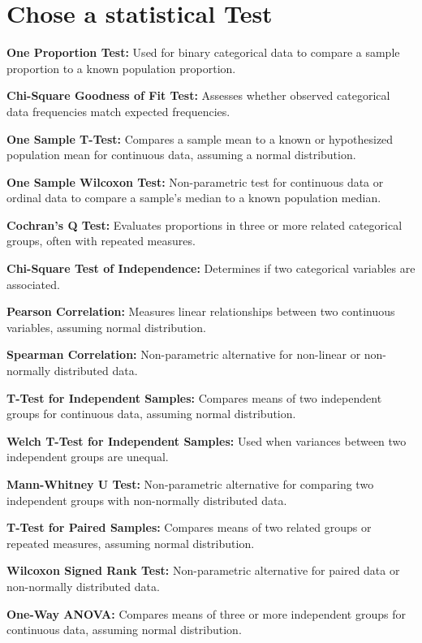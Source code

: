 \documentclass[
  a4paper,
]{scrbook}
\begin{document}

\chapter{Chose a statistical Test}\label{chose-a-statistical-test}

\textbf{One Proportion Test:} Used for binary categorical data to
compare a sample proportion to a known population proportion.

\textbf{Chi-Square Goodness of Fit Test:} Assesses whether observed
categorical data frequencies match expected frequencies.

\textbf{One Sample T-Test:} Compares a sample mean to a known or
hypothesized population mean for continuous data, assuming a normal
distribution.

\textbf{One Sample Wilcoxon Test:} Non-parametric test for continuous
data or ordinal data to compare a sample's median to a known population
median.

\textbf{Cochran's Q Test:} Evaluates proportions in three or more
related categorical groups, often with repeated measures.

\textbf{Chi-Square Test of Independence:} Determines if two categorical
variables are associated.

\textbf{Pearson Correlation:} Measures linear relationships between two
continuous variables, assuming normal distribution.

\textbf{Spearman Correlation:} Non-parametric alternative for non-linear
or non-normally distributed data.

\textbf{T-Test for Independent Samples:} Compares means of two
independent groups for continuous data, assuming normal distribution.

\textbf{Welch T-Test for Independent Samples:} Used when variances
between two independent groups are unequal.

\textbf{Mann-Whitney U Test:} Non-parametric alternative for comparing
two independent groups with non-normally distributed data.

\textbf{T-Test for Paired Samples:} Compares means of two related groups
or repeated measures, assuming normal distribution.

\textbf{Wilcoxon Signed Rank Test:} Non-parametric alternative for
paired data or non-normally distributed data.

\textbf{One-Way ANOVA:} Compares means of three or more independent
groups for continuous data, assuming normal distribution.
\end{document}
